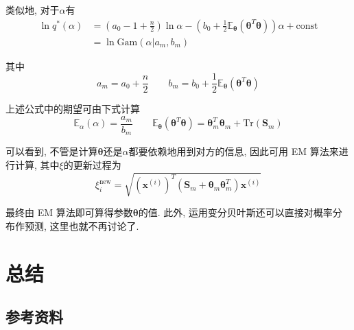 \documentclass[a4paper,UTF8]{ctexart}
\theoremstyle{plain} \newtheorem{theorem}{定理}[section]
\theoremstyle{plain} \newtheorem{definition}{定义}[section]
\theoremstyle{plain} \newtheorem{lemma}{引理}[section]
\theoremstyle{plain} \newtheorem{proposition}{命题}[section]
\theoremstyle{plain} \newtheorem{example}{例}[section]
\theoremstyle{plain} \newtheorem{remark}{注}[section]
\theoremstyle{plain} \newtheorem{corollary}{推论}[section]
\begin{document}
类似地, 对于$\alpha$有
\begin{align*}
\ln q^{*}(\alpha) & = \left( a_{0} - 1 + \frac{n}{2} \right) \ln \alpha - \left( b_{0} + \frac{1}{2} \mathbb{E}_{\bm{\theta}}(\bm{\theta}^{T} \bm{\theta}) \right) \alpha + \mathrm{const} \\
& = \ln \mathrm{Gam}(\alpha | a_{m}, b_{m})
\end{align*}

其中
\begin{equation*}
a_{m} = a_{0} + \frac{n}{2}  \qquad b_{m} = b_{0} + \frac{1}{2}\mathbb{E}_{\bm{\theta}}(\bm{\theta}^{T} \bm{\theta})
\end{equation*}

上述公式中的期望可由下式计算
\begin{equation*}
\mathbb{E}_{\alpha}(\alpha) = \frac{a_{m}}{b_{m}}  \qquad  \mathbb{E}_{\bm{\theta}}(\bm{\theta}^{T} \bm{\theta}) = \bm{\theta}_{m}^{T} \bm{\theta}_{m} + \mathrm{Tr}(\bm{S}_{m})
\end{equation*}

可以看到, 不管是计算$\bm{\theta}$还是$\alpha$都要依赖地用到对方的信息, 因此可用 EM 算法来进行计算, 其中$\xi$的更新过程为
\begin{equation*}
\xi_{i}^{\mathrm{new}} = \sqrt{(\bm{x}^{(i)})^{T} (\bm{S}_{m} + \bm{\theta}_{m} \bm{\theta}_{m}^{T}) \bm{x}^{(i)}}
\end{equation*}

最终由 EM 算法即可算得参数$\bm{\theta}$的值. 此外, 运用变分贝叶斯还可以直接对概率分布作预测, 这里也就不再讨论了.



\section{总结}

\subsection{参考资料}
\end{document}
